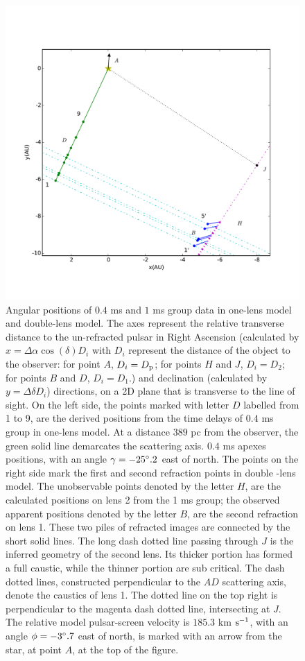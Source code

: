 \documentclass[useAMS,usenatbib]{mn2e}
\begin{document}
\begin{figure}
\centering
\includegraphics[width=7.5in]{Double_lens_xy.pdf}
\caption{Angular positions of $0.4$ ms and $1$ ms group data in one-lens model and double-lens model.  
The axes represent the relative transverse distance to the un-refracted pulsar in Right Ascension (calculated by $x= \Delta \alpha \cos(\delta)D_i$ with $D_i$ represent the distance of the object to the observer: for point $A$, $D_i=D_{\rm p}$; for points $H$ and $J$, $D_i=D_2$; for points $B$ and $D$, $D_i=D_1$.) and declination (calculated by $y=\Delta \delta D_i$) directions, on a 2D plane that is transverse to the line of sight. 
On the left side, the points marked with letter $D$ labelled from 1 to 9, are the derived
positions from the time delays of $0.4$ ms group in 
one-lens
model. At a distance $389$ pc from the observer, the green solid line
demarcates the scattering axis.
$0.4$ ms apexes positions, with an angle $\gamma=-25\degree.2$ east of
north. The points on the right side mark the first and second
refraction points in double -lens model.  
The unobservable points
denoted by the letter $H$, are the calculated positions on lens 2 from the
1
 ms group; the observed apparent positions denoted by the letter $B$, are the  
second refraction on lens 1.  
These two piles of
refracted images are connected by the short solid lines. The long
dash dotted line passing through $J$ is the inferred geometry of the second
lens.  Its thicker portion has formed a full caustic, while the
thinner portion are sub critical.
The dash 
dotted lines, constructed perpendicular to the $AD$ scattering axis,
denote the caustics of lens 1. The dotted line on the top right is
perpendicular to the magenta dash dotted line, intersecting at $J$.   
The relative model pulsar-screen velocity is $185.3$ km $\rm s^{-1}$, with an angle $\phi=-3\degree.7$ east of north, is marked with an arrow from the star, at point $A$, at the top of the figure.} 
\label{Doublelens}
\end{figure}
\end{document}
